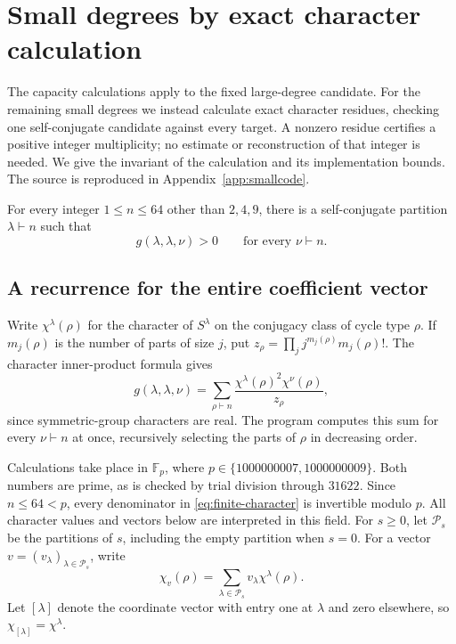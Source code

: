 \section{Small degrees by exact character calculation}
\label{sec:finite}

The capacity calculations apply to the fixed large-degree candidate.
For the remaining small degrees we instead calculate exact character
residues, checking one self-conjugate candidate against every target.
A nonzero residue certifies a positive integer multiplicity; no estimate
or reconstruction of that integer is needed. We give the invariant of
the calculation and its implementation bounds. The source is reproduced
in Appendix~\ref{app:smallcode}.

\begin{proposition}\label{prop:finite-check}
For every integer $1\leq n\leq64$ other than $2,4,9$, there is a
self-conjugate partition $\lambda\vdash n$ such that
\[
  g(\lambda,\lambda,\nu)>0\qquad\text{for every }\nu\vdash n.
\]
\end{proposition}

\subsection{A recurrence for the entire coefficient vector}

Write $\chi^\lambda(\rho)$ for the character of $S^\lambda$ on the
conjugacy class of cycle type $\rho$. If $m_j(\rho)$ is the number of
parts of size $j$, put $z_\rho=\prod_j j^{m_j(\rho)}m_j(\rho)!$.
The character inner-product formula gives
\begin{equation}\label{eq:finite-character}
 g(\lambda,\lambda,\nu)
 =\sum_{\rho\vdash n}
   \frac{\chi^\lambda(\rho)^2\chi^\nu(\rho)}{z_\rho},
\end{equation}
since symmetric-group characters are real. The program computes this
sum for every $\nu\vdash n$ at once, recursively selecting the parts
of $\rho$ in decreasing order.

Calculations take place in $\mathbb F_p$, where
$p\in\{1000000007,1000000009\}$. Both numbers are prime, as is checked by
trial division through $31622$. Since $n\le64<p$, every denominator
in \eqref{eq:finite-character} is invertible modulo $p$.
All character values and vectors below are interpreted in this field.
For $s\geq0$, let $\mathcal P_s$ be the partitions of $s$, including
the empty partition when $s=0$. For a vector
$v=(v_\lambda)_{\lambda\in\mathcal P_s}$, write
\[
  \chi_v(\rho)=\sum_{\lambda\in\mathcal P_s}v_\lambda\chi^\lambda(\rho).
\]
Let $[\lambda]$ denote the coordinate vector with entry one at $\lambda$
and zero elsewhere, so $\chi_{[\lambda]}=\chi^\lambda$.

